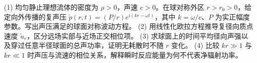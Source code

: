 (1) 均匀静止理想流体的密度为 \(\rho>0\)，声速 \(c>0\)。在球对称外区 \(r>r_0>0\)，给定向外传播的复声压 \(\tilde p(r,t)=(P/r)e^{i(kr-\omega t)}\)，其中 \(k=\omega/c\)、\(P\) 为实正幅度参数。写出声压满足的球面对称波动方程。
(2) 用线性化欧拉方程推导复径向质点速度 \(\tilde u_r\)，区分远场实部与近场正交相位项。
(3) 求球面上的时间平均径向声强以及穿过任意半径球面的总声功率，证明无耗散时不随 \(r\) 变化。
(4) 比较 \(kr\gg1\) 与 \(kr\ll1\) 时声压与流速的相位关系，解释瞬时反应能量为何不代表净辐射功率。
